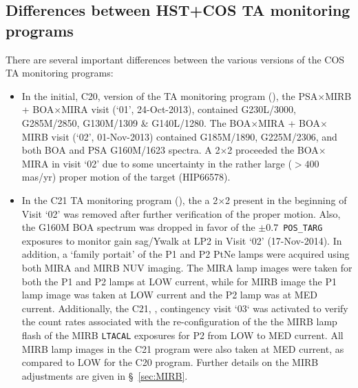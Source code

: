 \subsection{Differences between HST+COS TA monitoring programs}\label{subsec:differences}

There are several important differences between the various versions of the COS TA monitoring programs:

\begin{itemize}
\item{
In the initial, C20, version of the TA monitoring program (),
the PSA$\times$MIRB + BOA$\times$MIRA  visit (`01', 24-Oct-2013), contained G230L/3000, G285M/2850, G130M/1309 \& G140L/1280.
The BOA$\times$MIRA + BOA$\times$MIRB  visit (`02', 01-Nov-2013) contained G185M/1890, G225M/2306, and both BOA and PSA G160M/1623 spectra.
A 2$\times$2  proceeded the BOA$\times$MIRA  in visit `02' due to some uncertainty in the rather large ($> 400$ mas/yr) proper motion of the target (HIP66578).
}
\item{
In the C21 TA monitoring program (), the a 2$\times$2  present in the beginning of Visit `02' was removed after further verification of the proper motion.
Also, the G160M BOA spectrum was dropped in favor of the $\pm 0.7$\arcsec~\texttt{POS\_TARG} exposures to monitor gain sag/Ywalk at LP2 in Visit `02' (17-Nov-2014).
In addition, a `family portait' of the P1 and P2 PtNe lamps were acquired using both MIRA and MIRB NUV imaging.
The MIRA lamp images were taken for both the P1 and P2 lamps at LOW current, while for MIRB image the P1 lamp image was taken at LOW current and the P2 lamp was at MED current.
Additionally, the C21, , contingency visit `03` was activated to verify the count rates associated with the re-configuration of the
the MIRB  lamp flash of the MIRB \texttt{LTACAL} exposures for P2 from LOW to MED current.
All MIRB lamp images in the C21 program were also taken at MED current, as  compared to LOW for the C20 program.
Further details on the MIRB  adjustments are given in \S~\ref{sec:MIRB}.\\

}
\end{itemize}
